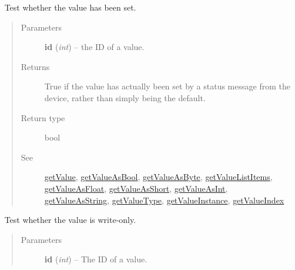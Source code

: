 \documentclass[letterpaper,10pt,english]{sphinxmanual}
\begin{document}
\begin{fulllineitems}
\begin{fulllineitems}
\end{fulllineitems}


\begin{fulllineitems}
\label{libopenzwave:libopenzwave.PyManager.isValueSet}~\label{libopenzwave:isvalueset}
Test whether the value has been set.
\begin{quote}\begin{description}
\item[{Parameters}] \leavevmode
\textbf{id} (\emph{int}) -- the ID of a value.

\item[{Returns}] \leavevmode
True if the value has actually been set by a status message from the device, rather than simply being the default.

\item[{Return type}] \leavevmode
bool

\item[{See}] \leavevmode
{\hyperref[libopenzwave:getvalue]{getValue}}, {\hyperref[libopenzwave:getvalueasbool]{getValueAsBool}}, {\hyperref[libopenzwave:getvalueasbyte]{getValueAsByte}}, {\hyperref[libopenzwave:getvaluelistitems]{getValueListItems}}, {\hyperref[libopenzwave:getvalueasfloat]{getValueAsFloat}}, {\hyperref[libopenzwave:getvalueasshort]{getValueAsShort}}, {\hyperref[libopenzwave:getvalueasint]{getValueAsInt}}, {\hyperref[libopenzwave:getvalueasstring]{getValueAsString}}, {\hyperref[libopenzwave:getvaluetype]{getValueType}}, {\hyperref[libopenzwave:getvalueinstance]{getValueInstance}}, {\hyperref[libopenzwave:getvalueindex]{getValueIndex}}

\end{description}\end{quote}

\end{fulllineitems}


\begin{fulllineitems}
\label{libopenzwave:libopenzwave.PyManager.isValueWriteOnly}~\label{libopenzwave:isvaluewriteonly}
Test whether the value is write-only.
\begin{quote}\begin{description}
\item[{Parameters}] \leavevmode
\textbf{id} (\emph{int}) -- The ID of a value.


\end{description}
\end{quote}
\end{fulllineitems}
\end{fulllineitems}
\end{document}
